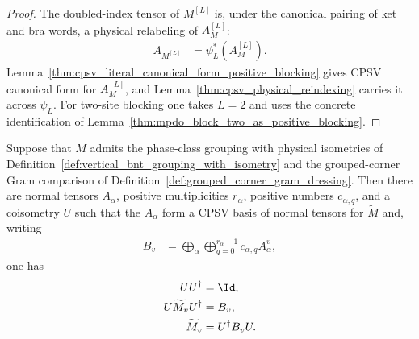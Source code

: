 \begin{proof}\leanok
    The doubled-index tensor of $M^{[L]}$ is, under the canonical pairing of
    ket and bra words, a physical relabeling of $A_M^{[L]}$:
    \begin{align}
        A_{M^{[L]}}
         & =\psi_L^*(A_M^{[L]}).
        \label{eq:mpdo_cpsv_block_tensor_reindex}
    \end{align}
    Lemma~\ref{thm:cpsv_literal_canonical_form_positive_blocking} gives
    CPSV canonical form for $A_M^{[L]}$, and
    Lemma~\ref{thm:cpsv_physical_reindexing} carries it across
    $\psi_L$. For two-site blocking one takes $L=2$ and uses the concrete
    identification of Lemma~\ref{thm:mpdo_block_two_as_positive_blocking}.
\end{proof}

\begin{lemma}
    \label{thm:mpdo_literal_cpsv_vertical_decomposition}
    \leanok
    Suppose that $M$ admits the phase-class grouping with physical isometries
    of Definition~\ref{def:vertical_bnt_grouping_with_isometry} and the
    grouped-corner Gram comparison of
    Definition~\ref{def:grouped_corner_gram_dressing}. Then there are
    normal tensors $A_\alpha$, positive multiplicities $r_\alpha$, positive
    numbers $c_{\alpha,q}$, and a coisometry $U$ such that the
    $A_\alpha$ form a CPSV basis of normal tensors for $\widetilde M$ and,
    writing
    \begin{align}
        B_v
         & =\bigoplus_\alpha\bigoplus_{q=0}^{r_\alpha-1}
        c_{\alpha,q}A_\alpha^v,
        \label{eq:mpdo_literal_cpsv_vertical_decomposition_block}
    \end{align}
    one has
    \begin{align}
        UU^\dagger               & =\Id,
        \notag                                      \\
        U\widetilde M_vU^\dagger & =B_v,
        \notag                                      \\
        \widetilde M_v           & =U^\dagger B_vU.
        \label{eq:mpdo_literal_cpsv_vertical_decomposition}
    \end{align}
\end{lemma}

